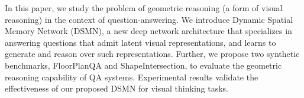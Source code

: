 In this paper, we study the problem of geometric reasoning (a form of visual reasoning) in the context of question-answering. We introduce Dynamic Spatial Memory Network (DSMN), a new deep network architecture that specializes in answering questions that admit latent visual representations, and learns to generate and reason over such representations. Further, we propose two synthetic benchmarks, FloorPlanQA and ShapeIntersection, to evaluate the geometric reasoning capability of QA systems. Experimental results validate the effectiveness of our proposed DSMN for visual thinking tasks.
